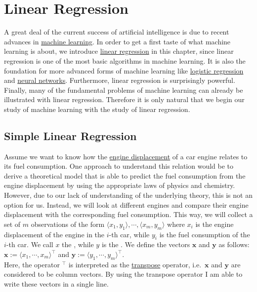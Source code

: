 \chapter{Linear Regression}
A great deal of the current success of artificial intelligence is due to recent advances in
\href{https://en.wikipedia.org/wiki/Machine_learning}{machine learning}.  
In order to get a first taste of what machine learning is about, we introduce 
\href{https://en.wikipedia.org/wiki/Linear_regression}{linear regression} in this chapter, since linear regression
is one of the most basic algorithms in machine learning.  It is also the foundation for more advanced
forms of machine learning like \href{https://en.wikipedia.org/wiki/Logistic_regression}{logistic regression} and 
\href{https://en.wikipedia.org/wiki/Artificial_neural_network}{neural networks}.
Furthermore, linear regression is surprisingly powerful.  Finally, many of the fundamental problems of machine
learning can already be illustrated with linear regression.  Therefore it is only natural that we begin our
study of machine learning with the study of linear regression.

\section{Simple Linear Regression}
Assume we want to know how the \href{https://en.wikipedia.org/wiki/Engine_displacement}{engine displacement} of
a car engine relates to its fuel consumption.  One approach to understand this relation would be to derive a
theoretical model that is able to predict the fuel consumption from the engine displacement by using the
appropriate laws of physics and chemistry.  However, due to our lack of understanding of the underlying theory,
this is not an option for us.  Instead, we will look at different engines and compare 
their engine displacement with the corresponding fuel consumption.  This way, we will collect a set of  
$m$ observations of the form $\langle x_1, y_1\rangle, \cdots, \langle x_m, y_m\rangle$ 
where $x_i$ is the engine displacement of the engine in the $i$-th car, while $y_i$ is the fuel consumption of the
$i$-th car.  We call $x$ the , while $y$ is the 
.  We define the vectors $\mathbf{x}$ and $\mathbf{y}$ as follows:
\\[0.2cm]
\hspace*{1.3cm}
$\mathbf{x} := \langle x_1, \cdots, x_m \rangle^\top$ \quad and \quad
$\mathbf{y} := \langle y_1, \cdots, y_m \rangle^\top$.
\\[0.2cm]
Here, the operator $^\top$ is interpreted as the \href{https://en.wikipedia.org/wiki/Transpose}{transpose} operator,
i.e.~$\mathbf{x}$ and $\mathbf{y}$ are considered to be column vectors.  By using the transpose operator I am
able to write these vectors in a single line.

